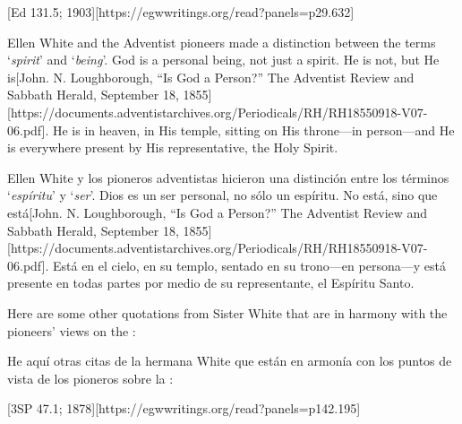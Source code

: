 [Ed 131.5; 1903][https://egwwritings.org/read?panels=p29.632]


Ellen White and the Adventist pioneers made a distinction between the terms ‘\textit{spirit}’ and ‘\textit{being}’. God is a personal being, not just a spirit. He is not, but He is[John. N. Loughborough, “Is God a Person?” The Adventist Review and Sabbath Herald, September 18, 1855][https://documents.adventistarchives.org/Periodicals/RH/RH18550918-V07-06.pdf]. He is in heaven, in His temple, sitting on His throne—in person—and He is everywhere present by His representative, the Holy Spirit.


Ellen White y los pioneros adventistas hicieron una distinción entre los términos ‘\textit{espíritu}’ y ‘\textit{ser}’. Dios es un ser personal, no sólo un espíritu. No está, sino que está[John. N. Loughborough, “Is God a Person?” The Adventist Review and Sabbath Herald, September 18, 1855][https://documents.adventistarchives.org/Periodicals/RH/RH18550918-V07-06.pdf]. Está en el cielo, en su templo, sentado en su trono—en persona—y está presente en todas partes por medio de su representante, el Espíritu Santo.


Here are some other quotations from Sister White that are in harmony with the pioneers’ views on the :


He aquí otras citas de la hermana White que están en armonía con los puntos de vista de los pioneros sobre la :


[3SP 47.1; 1878][https://egwwritings.org/read?panels=p142.195]


